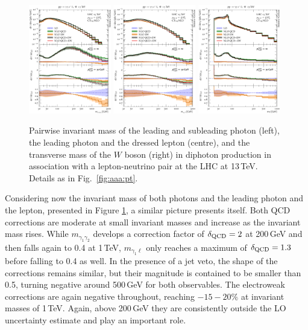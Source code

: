 \begin{figure}[t!]
  \centering
  \includegraphics[width=0.32\textwidth]{figs_aaw/m_y1y2_comb_log}
  \includegraphics[width=0.32\textwidth]{figs_aaw/m_y1l1_comb_log}
  \includegraphics[width=0.32\textwidth]{figs_aaw/m_t_comb_log}
  \caption{
    Pairwise invariant mass of the leading and subleading photon (left),
    the leading photon and the dressed lepton (centre), and the 
    transverse mass of the $W$ boson (right)
    in diphoton production in association with a lepton-neutrino 
    pair at the LHC at 13\,TeV. 
    Details as in Fig.\ \ref{fig:aaa:pt}.
    \label{fig:aaw:myy}
  }
\end{figure}

Considering now the invariant mass of both photons 
and the leading photon and the lepton, presented in 
Figure \ref{fig:aaw:myy}, a similar picture 
presents itself. 
Both QCD corrections are moderate at small invariant 
masses and increase as the invariant mass rises. 
While $m_{\gamma_1\gamma_2}$ develops a correction 
factor of $\delta_\text{QCD}=2$ at 200\,GeV and then falls 
again to 0.4 at 1\,TeV, $m_{\gamma_1\ell}$ only 
reaches a maximum of $\delta_\text{QCD}=1.3$ before falling 
to 0.4 as well. 
In the presence of a jet veto, the shape of the corrections 
remains similar, but their magnitude is contained to 
be smaller than 0.5, turning negative around 500\,GeV 
for both observables. 
The electroweak corrections are again negative 
throughout, reaching $-15-20\%$ at invariant masses 
of 1\,TeV.
Again, above 200\,GeV they are consistently outside 
the LO uncertainty estimate and play an important 
role.

